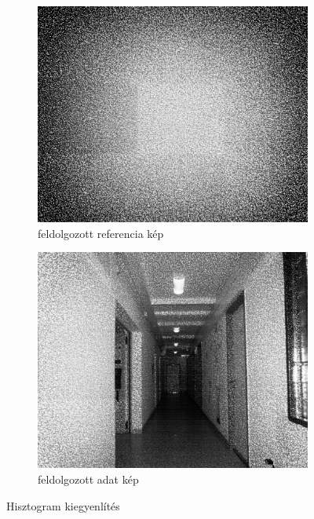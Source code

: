 \begin{figure}[ht!]
	\begin{subfigure}{.5\textwidth}
	  \centering
	  \includegraphics[width=0.9\linewidth]{figures/eq_ref.png}
	  \caption{feldolgozott referencia kép}
	  \label{fig:eqRef}
	\end{subfigure}
	\begin{subfigure}{.5\textwidth}
	  \centering
	  \includegraphics[width=0.9\linewidth]{figures/eq_data.png}
	  \caption{feldolgozott adat kép}
	  \label{fig:eqData}
	\end{subfigure}
	\caption{Hisztogram kiegyenlítés}
	\label{fig:eqPreproc}
\end{figure}


